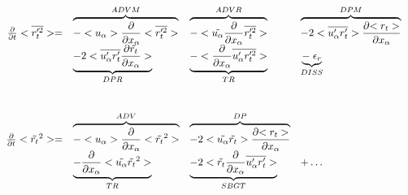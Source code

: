 \begin{displaymath}
\left.
\begin{array}{rllll}
\frac{\partial }{\partial t} <\overline{r_t'^2}> = & 
\overbrace{- <u_\alpha>\frac{\partial}{\partial x_\alpha} <\overline{r_t'^2}> }^{ADVM}  &
\overbrace{- <\tilde{u_\alpha}\frac{\partial}{\partial x_\alpha} \overline{r_t'^2} > }^{ADVR} &
\overbrace{- 2 <\overline{u_\alpha'r_t'}> \frac{\partial {<r_t>}}{\partial x_\alpha} }^{DPM} \\
\vspace*{1.0cm}
& \underbrace{- 2 <\overline{u'_\alpha r_t'} \frac{\partial {\tilde{r_t}}}{\partial x_\alpha}>}_{DPR}  &
 \underbrace{- <\frac{\partial}{\partial x_\alpha} \overline{u'_\alpha r_t'^2}>}_{TR}
 & \underbrace{-\; \epsilon_{r}}_{DISS}\\
\frac{\partial }{\partial t} <\tilde{r_t}^2> = & 
\overbrace{- <u_\alpha>\frac{\partial}{\partial x_\alpha} <\tilde{r_t}^2> }^{ADV} &
\overbrace{- 2<\tilde{u_\alpha} \tilde{r_t}> \frac{\partial {<r_t>}}{\partial x_\alpha}}^{DP} &\\
& \underbrace{- \frac{\partial}{\partial x_\alpha} <\tilde{u_\alpha} \tilde{r_t}^2>}_{TR} &
\underbrace{- 2 <\tilde{r_t}\frac{\partial}{\partial x_\alpha}\overline{u'_\alpha r_t'}>}_{SBGT} & + \ldots
\end{array}
\right.
\end{displaymath}

